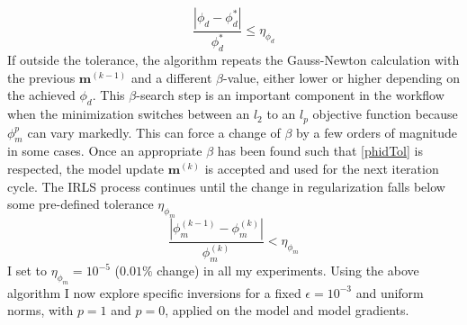 \begin{equation}\label{phidTol}
\frac{|\phi_d- \phi_d^*|}{\phi_d^*} \leq \eta_{\phi_d}
\end{equation}
If outside the tolerance, the algorithm repeats the Gauss-Newton calculation with the previous $\mathbf{m}^{(k-1)}$ and a different $\beta$-value, either lower or higher depending on the achieved $\phi_d$. This $\beta$-search step is an important component in the workflow when the minimization switches between an $l_2$ to an $l_p$ objective function because $\phi_m^p$ can vary markedly. This can force a change of $\beta$ by a few orders of magnitude in some cases.
Once an appropriate $\beta$ has been found such that \eqref{phidTol} is respected, the model update $\mathbf{m}^{(k)}$ is accepted and used for the next iteration cycle. The IRLS process continues until the change in regularization falls below some pre-defined tolerance $\eta_{\phi_m}$
\begin{equation}\label{phimTol}
\frac{|\phi_m^{(k-1)}-\phi_m^{(k)}|}{\phi_m^{(k)}} < \eta_{\phi_m}
\end{equation}
I set to $\eta_{\phi_m} =10^{-5}$ ($0.01\%$ change) in all my experiments.
Using the above algorithm I now explore specific inversions for a fixed $\epsilon=10^{-3}$ and uniform norms, with $p=1$ and $p=0$, applied on the model and model gradients.

